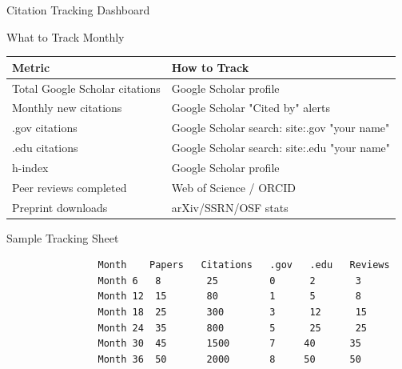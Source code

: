 \documentclass[11pt]{beamer}
\begin{document}
	\begin{frame}{Citation Tracking Dashboard}
		\scriptsize
		\begin{block}{What to Track Monthly}
			\centering
			\begin{tabular}{|p{4cm}|p{5.5cm}|}
				\hline
				\textbf{Metric} & \textbf{How to Track} \\
				\hline
				Total Google Scholar citations & Google Scholar profile \\
				\hline
				Monthly new citations & Google Scholar "Cited by" alerts \\
				\hline
				.gov citations & Google Scholar search: site:.gov "your name" \\
				\hline
				.edu citations & Google Scholar search: site:.edu "your name" \\
				\hline
				h-index & Google Scholar profile \\
				\hline
				Peer reviews completed & Web of Science / ORCID \\
				\hline
				Preprint downloads & arXiv/SSRN/OSF stats \\
				\hline
			\end{tabular}
		\end{block}
		\begin{block}{Sample Tracking Sheet}
			\begin{verbatim}
				Month    Papers   Citations   .gov   .edu   Reviews
				Month 6   8        25         0      2       3
				Month 12  15       80         1      5       8
				Month 18  25       300        3      12      15
				Month 24  35       800        5      25      25
				Month 30  45       1500       7     40      35
				Month 36  50       2000       8     50      50
			\end{verbatim}
		\end{block}
	\end{frame}
	
\end{document}

